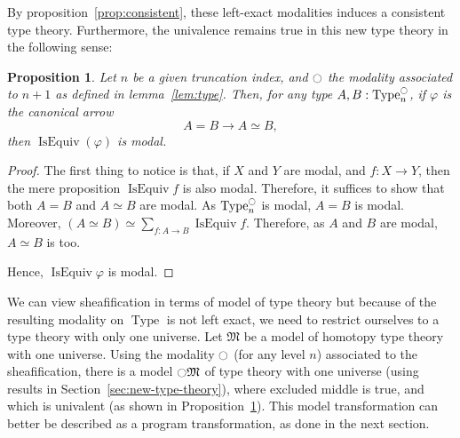 \documentclass[preprint,9pt,numbers]{sigplanconf}
\newtheorem{prop}[thm]{Proposition}
\newcommand \defeq {\overset{de\hspace{-0.2ex}f}{=}}
\DeclareMathOperator{\Type}{Type}
\DeclareMathOperator{\HProp}{HProp}
\DeclareMathOperator{\nat}{nat}
\DeclareMathOperator{\IsEquiv}{IsEquiv}
\newcommand{\modal}{\ensuremath{\ocircle}}
\newcommand \True {\mathrm{true}}
\newcommand \two {\mathbf{2}}
\newenvironment{mymath}[1][-0em]{%
  \newcommand\mymathaux{\vspace{#1}}%
  \vspace{#1}%
  \begin{equation*}%
  }{ %
    \mymathaux%
  \end{equation*}}
\begin{document}
By proposition~\ref{prop:consistent}, these left-exact modalities
induces a consistent type theory. Furthermore, the univalence remains
true in this new type theory in the following sense:
\begin{prop}\label{prop:univalence}
  Let $n$ be a given truncation index, and $\modal$ the modality
  associated to $n+1$ as defined in lemma~\ref{lem:type}. Then, for
  any type $A,B:\Type_n^\modal$, if $\varphi$ is the canonical arrow
  $$A = B \to A\simeq B,$$
  then $\IsEquiv(\varphi)$ is modal.
\end{prop}
\begin{proof}
  The first thing to notice is that, if $X$ and $Y$ are modal, and
  $f:X \to Y$, then the mere proposition $\IsEquiv f$ is also modal.
  Therefore, it suffices to show that both $A=B$ and $A\simeq B$ are
  modal. As $\Type_n^\modal$ is modal, $A=B$ is modal. 
  Moreover, $(A\simeq B) \simeq \sum_{f:A\to B} \IsEquiv
  f$. Therefore, as $A$ and $B$ are modal, $A\simeq B$ is too. 

  Hence, $\IsEquiv \varphi$ is modal.
\end{proof}

We can view sheafification in terms of model of type theory but
because of the resulting modality on $\Type$ is not left exact, we
need to restrict ourselves to a type theory with only one universe.
%
Let $\mathfrak M$ be a model of homotopy type theory with one
universe.
%
Using the modality $\modal$ (for any level $n$) associated to the
sheafification, there is a model $\modal \mathfrak M$ of type theory
with one universe (using results in
Section~\ref{sec:new-type-theory}), where excluded middle is true, and
which is univalent (as shown in Proposition~\ref{prop:univalence}).
%
This model transformation can better be described as a program
transformation, as done in the next section.  


\end{document}
